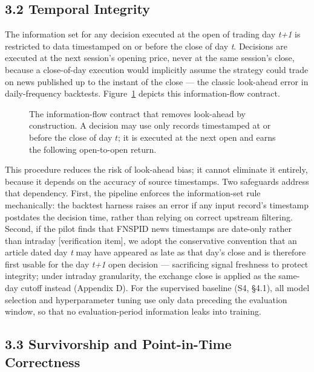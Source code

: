 \documentclass[
  12pt,
]{article}
\begin{document}
\hypertarget{temporal-integrity}{%
\subsection{3.2 Temporal Integrity}\label{temporal-integrity}}

The information set for any decision executed at the open of trading day
\emph{t+1} is restricted to data timestamped on or before the close of
day \emph{t}. Decisions are executed at the next session's opening
price, never at the same session's close, because a close-of-day
execution would implicitly assume the strategy could trade on news
published up to the instant of the close --- the classic look-ahead
error in daily-frequency backtests. Figure~\ref{fig:execution} depicts this information-flow contract.

\begin{figure}[htbp]
\centering
\resizebox{\linewidth}{!}{}
\caption{The information-flow contract that removes look-ahead by construction. A decision may use only records timestamped at or before the close of day $t$; it is executed at the next open and earns the following open-to-open return.}
\label{fig:execution}
\end{figure}

 This procedure reduces the risk of
look-ahead bias; it cannot eliminate it entirely, because it depends on
the accuracy of source timestamps. Two safeguards address that
dependency. First, the pipeline enforces the information-set rule
mechanically: the backtest harness raises an error if any input record's
timestamp postdates the decision time, rather than relying on correct
upstream filtering. Second, if the pilot finds that FNSPID news
timestamps are date-only rather than intraday {[}verification item{]},
we adopt the conservative convention that an article dated day \emph{t}
may have appeared as late as that day's close and is therefore first
usable for the day \emph{t+1} open decision --- sacrificing signal
freshness to protect integrity; under intraday granularity, the exchange
close is applied as the same-day cutoff instead (Appendix D). For the
supervised baseline (S4, §4.1), all model selection and hyperparameter
tuning use only data preceding the evaluation window, so that no
evaluation-period information leaks into training.

\hypertarget{survivorship-and-point-in-time-correctness}{%
\subsection{3.3 Survivorship and Point-in-Time
Correctness}\label{survivorship-and-point-in-time-correctness}}
\end{document}
